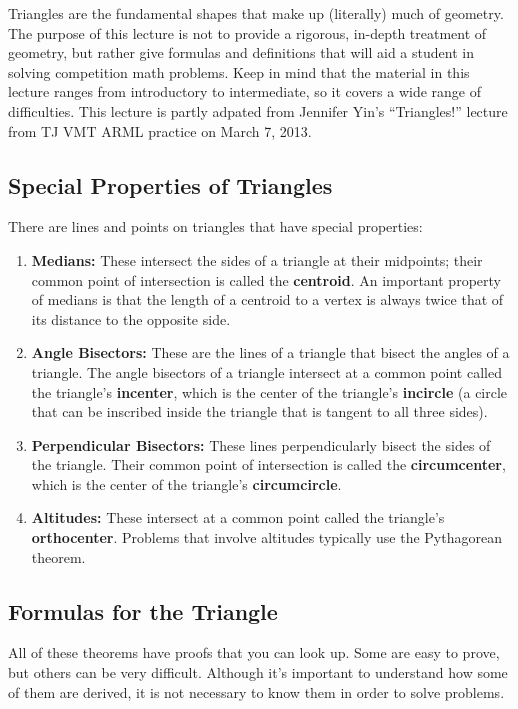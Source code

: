 Triangles are the fundamental shapes that make up (literally) much of geometry. The purpose of this lecture is not to provide a rigorous, in-depth treatment of geometry, but rather give formulas and definitions that will aid a student in solving competition math problems. Keep in mind that the material in this lecture ranges from introductory to intermediate, so it covers a wide range of difficulties. This lecture is partly adpated from Jennifer Yin's ``Triangles!'' lecture from TJ VMT ARML practice on March 7, 2013.
\subsection{Special Properties of Triangles}
There are lines and points on triangles that have special properties:
\begin{enumerate}
    \item \textbf{Medians:} These intersect the sides of a triangle at their midpoints; their common point of intersection is called the \textbf{centroid}. An important property of medians is that the length of a centroid to a vertex is always twice that of its distance to the opposite side.
    \item \textbf{Angle Bisectors:} These are the lines of a triangle that bisect the angles of a triangle. The angle bisectors of a triangle intersect at a common point called the triangle's \textbf{incenter}, which is the center of the triangle's \textbf{incircle} (a circle that can be inscribed inside the triangle that is tangent to all three sides).
    \item \textbf{Perpendicular Bisectors:} These lines perpendicularly bisect the sides of the triangle. Their common point of intersection is called the \textbf{circumcenter}, which is the center of the triangle's \textbf{circumcircle}.
    \item \textbf{Altitudes:} These intersect at a common point called the triangle's \textbf{orthocenter}. Problems that involve altitudes typically use the Pythagorean theorem.
\end{enumerate}

\clearpage
\subsection{Formulas for the Triangle}
All of these theorems have proofs that you can look up. Some are easy to prove, but others can be very difficult. Although it's important to understand how some of them are derived, it is not necessary to know them in order to solve problems.
